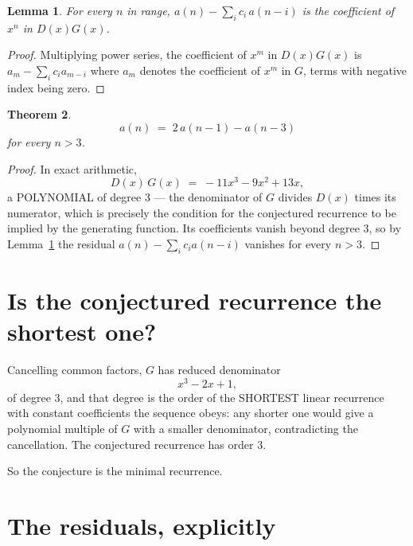 \documentclass[11pt,a4paper]{article}
\theoremstyle{plain}
\newtheorem{theorem}{Theorem}
\newtheorem{lemma}[theorem]{Lemma}
\theoremstyle{definition}
\begin{document}
\begin{lemma}\label{lem:key}
For every $n$ in range, $a(n)-\sum_i c_i\,a(n-i)$ is the coefficient of $x^{n}$ in
$D(x)G(x)$.
\end{lemma}

\begin{proof}
Multiplying power series, the coefficient of $x^{m}$ in $D(x)G(x)$ is
$a_m-\sum_i c_i a_{m-i}$ where $a_m$ denotes the coefficient of $x^{m}$ in $G$, terms with
negative index being zero.
\end{proof}

\begin{theorem}
\[
a(n)\;=\;2\,a(n-1) - a(n-3)
\]
for every $n>3$.
\end{theorem}

\begin{proof}
In exact arithmetic,
\[
D(x)\,G(x)\;=\;- 11 x^{3} - 9 x^{2} + 13 x,
\]
a POLYNOMIAL of degree $3$ --- the denominator of $G$ divides $D(x)$ times its numerator,
which is precisely the condition for the conjectured recurrence to be implied by the
generating function. Its coefficients vanish beyond degree $3$, so by
Lemma~\ref{lem:key} the residual $a(n)-\sum_ic_ia(n-i)$ vanishes for every
$n>3$.
\end{proof}

\section{Is the conjectured recurrence the shortest one?}

Cancelling common factors, $G$ has reduced denominator
\[
x^{3} - 2 x + 1,
\]
of degree $3$, and that degree is the order of the SHORTEST linear recurrence with
constant coefficients the sequence obeys: any shorter one would give a polynomial multiple of
$G$ with a smaller denominator, contradicting the cancellation. The conjectured recurrence has
order $3$.

So the conjecture is the minimal recurrence.

\section{The residuals, explicitly}
\end{document}
